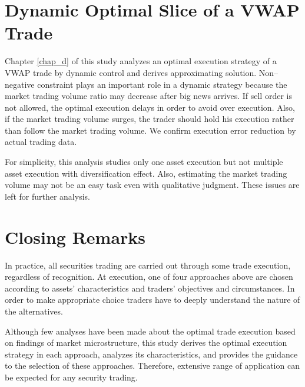 \section{Dynamic Optimal Slice of a VWAP Trade}\label{sec_c5}
Chapter \ref{chap_d} of this study analyzes an optimal execution strategy of a VWAP trade by dynamic control and derives approximating solution. Non--negative constraint plays an important role in a dynamic strategy because the market trading volume ratio may decrease after big news arrives.  If sell order is not allowed, the optimal execution delays in order to avoid over execution.  Also, if the market trading volume surges, the trader should hold his execution rather than follow the market trading volume.  We confirm execution error reduction by actual trading data.

For simplicity, this analysis studies only one asset execution but not multiple asset execution with diversification effect.  Also, estimating the market trading volume may not be an easy task even with qualitative judgment.  These issues are left for further analysis.

\section{Closing Remarks}\label{sec_c6}
In practice, all securities trading are carried out through some trade execution, regardless of recognition.  At execution, one of four approaches above are chosen according to assets' characteristics and traders' objectives and circumstances.  In order to make appropriate choice traders have to deeply understand the nature of the alternatives.  

Although few analyses have been made about the optimal trade execution
based on findings of market microstructure, this study derives the
optimal execution strategy in each approach, analyzes its
characteristics, and provides the guidance to the selection of these
approaches.  Therefore, extensive range of application can be expected
for any security trading.

